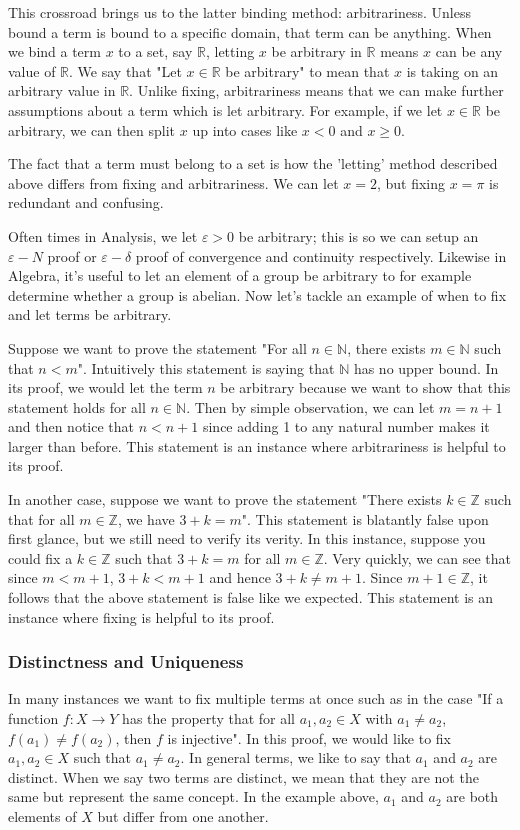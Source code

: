 \documentclass[12pt]{book}
\def\N{{\mathbb{N}}}
\def\R{{\mathbb{R}}}
\def\Z{{\mathbb{Z}}}
\begin{document}
	This crossroad brings us to the latter binding method: arbitrariness. Unless bound a term is bound to a specific domain, that term can be anything. When we bind a term $x$ to a set, say $\R$, letting $x$ be arbitrary in $\R$ means $x$ can be any value of $\R$. We say that "Let $x\in\R$ be arbitrary" to mean that $x$ is taking on an arbitrary value in $\R$. Unlike fixing, arbitrariness means that we can make further assumptions about a term which is let arbitrary. For example, if we let $x\in\R$ be arbitrary, we can then split $x$ up into cases like $x<0$ and $x\geq 0$. 
	
	 The fact that a term must belong to a set is how the 'letting' method described above differs from fixing and arbitrariness. We can let $x=2$, but fixing $x=\pi$ is redundant and confusing. 
	 
	 Often times in Analysis, we let $\varepsilon>0$ be arbitrary; this is so we can setup an $\varepsilon-N$ proof or $\varepsilon-\delta$ proof of convergence and continuity respectively. Likewise in Algebra, it's useful to let an element of a group be arbitrary to for example determine whether a group is abelian. Now let's tackle an example of when to fix and let terms be arbitrary.
	 
	 Suppose we want to prove the statement "For all $n\in\N$, there exists $m\in\N$ such that $n<m$". Intuitively this statement is saying that $\N$ has no upper bound. In its proof, we would let the term $n$ be arbitrary because we want to show that this statement holds for all $n\in\N$. Then by simple observation, we can let $m=n+1$ and then notice that $n<n+1$ since adding 1 to any natural number makes it larger than before. This statement is an instance where arbitrariness is helpful to its proof.
	 
	 In another case, suppose we want to prove the statement "There exists $k\in\Z$ such that for all $m\in\Z$, we have $3+k=m$". This statement is blatantly false upon first glance, but we still need to verify its verity. In this instance, suppose you could fix a $k\in\Z$ such that $3+k=m$ for all $m\in\Z$. Very quickly, we can see that since $m<m+1$, $3+k<m+1$ and hence $3+k\neq m+1$. Since $m+1\in\Z$, it follows that the above statement is false like we expected. This statement is an instance where fixing is helpful to its proof.
	
\subsubsection*{Distinctness and Uniqueness}
	In many instances we want to fix multiple terms at once such as in the case "If a function $f\colon X\rightarrow Y$ has the property that for all $a_1,a_2\in X$ with $a_1\neq a_2$, $f(a_1)\neq f(a_2)$, then $f$ is injective". In this proof, we would like to fix $a_1,a_2\in X$ such that $a_1\neq a_2$. In general terms, we like to say that $a_1$ and $a_2$ are distinct. When we say two terms are distinct, we mean that they are not the same but represent the same concept. In the example above, $a_1$ and $a_2$ are both elements of $X$ but differ from one another.
	
\end{document}
